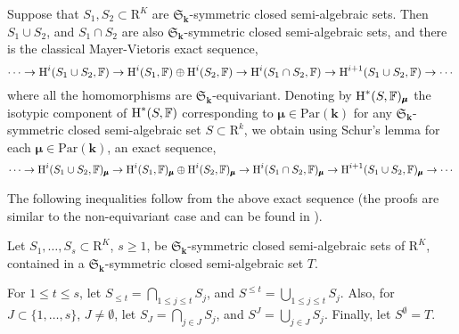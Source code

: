 \documentclass{amsart}
\theoremstyle{definition}
\theoremstyle{remark}
\numberwithin{equation}{section}
\begin{document}
Suppose that $S_1,S_2 \subset {\mathrm{R}}^K$ are $\mathfrak{S}_{\mathbf{k}}$-symmetric closed semi-algebraic sets.
Then $S_1 \cup S_2$, and $S_1 \cap S_2$ are also $\mathfrak{S}_{\mathbf{k}}$-symmetric closed semi-algebraic sets, and  there is the classical Mayer-Vietoris exact sequence,
\[
\cdots \rightarrow {\mbox{\rm H}}^{i}(S_1\cup S_2,{\mathbb{F}}) \rightarrow {\mbox{\rm H}}^{i}(S_1,{\mathbb{F}}) \oplus {\mbox{\rm H}}^{i}(S_2,{\mathbb{F}}) \rightarrow {\mbox{\rm H}}^i(S_1\cap S_2,{\mathbb{F}}) \rightarrow {\mbox{\rm H}}^{i+1}(S_1 \cup S_2,{\mathbb{F}}) \rightarrow \cdots 
\]  
where all the homomorphisms are $\mathfrak{S}_{\mathbf{k}}$-equivariant. Denoting by ${\mbox{\rm H}}^*(S,{\mathbb{F}})_{\pmb{\mu}}$ the isotypic component of ${\mbox{\rm H}}^*(S,{\mathbb{F}})$ corresponding to $\pmb{\mu} \in {\mathrm{Par}}({\mathbf{k}})$ for any $\mathfrak{S}_{\mathbf{k}}$-symmetric closed semi-algebraic set $S \subset{\mathrm{R}}^k$, we
obtain using Schur's lemma for each $\pmb{\mu} \in {\mathrm{Par}}({\mathbf{k}})$, an exact sequence,
\[
\cdots \rightarrow {\mbox{\rm H}}^{i}(S_1\cup S_2,{\mathbb{F}})_{\pmb{\mu}} \rightarrow {\mbox{\rm H}}^{i}(S_1,{\mathbb{F}})_{\pmb{\mu}} \oplus {\mbox{\rm H}}^{i}(S_2,{\mathbb{F}})_{\pmb{\mu}} \rightarrow {\mbox{\rm H}}^i(S_1\cap S_2,{\mathbb{F}})_{\pmb{\mu}} \rightarrow {\mbox{\rm H}}^{i+1}(S_1 \cup S_2,{\mathbb{F}})_{\pmb{\mu}} \rightarrow \cdots 
\]  

The following inequalities follow from the above exact sequence (the proofs are similar to the 
non-equivariant case and can be found in \cite{BPRbook2}).

Let $S_{1} , \ldots ,S_{s} \subset {\mathrm{R}}^{K}$, $s \ge 1$, be $\mathfrak{S}_{\mathbf{k}}$-symmetric closed
semi-algebraic sets of ${\mathrm{R}}^{K}$, contained in a $\mathfrak{S}_{\mathbf{k}}$-symmetric 
closed semi-algebraic set $T$.

For $1 \leq t \leq s$, let $S_{\le t} = \bigcap_{1 \leq j \leq t} S_{j}$, and
$S^{\le t} = \bigcup_{1 \leq j \leq t} S_{j}$.
Also, for $J \subset \{1, \ldots ,s\}$, $J \neq \emptyset$, let $S_{J} =
\bigcap_{j \in J} S_{j}$, and
$S^{J} = \bigcup_{j \in J} S_{j}$. Finally, let $S^{\emptyset} =T$.
\end{document}
